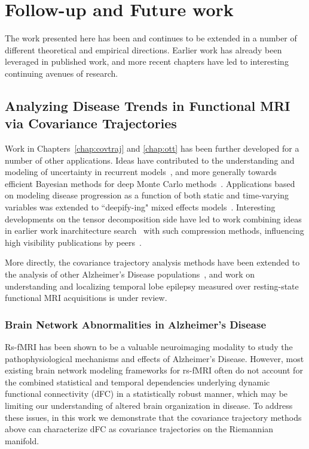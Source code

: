 \chapter{Follow-up and Future work}\label{chap:discuss}

The work presented here has been and continues 
to be extended in a number of different theoretical 
and empirical directions.
Earlier work has already been leveraged in published work,
and more recent chapters
have led to interesting
continuing avenues of research.

\section{Analyzing Disease Trends in Functional MRI via Covariance Trajectories}

Work in Chapters~\ref{chap:covtraj} and \ref{chap:ott} has been further developed for a number of other applications.
Ideas have contributed
to the understanding and modeling of uncertainty
in recurrent models~\citep{spgru},
and more generally towards efficient
Bayesian methods for deep Monte Carlo methods~\citep{mcreparam}.
Applications based on modeling disease progression
as a function of both static and time-varying 
variables was extended to ``deepify-ing" mixed effects models~\citep{deepmem}.
Interesting developments on the tensor decomposition side
have led to work combining ideas
in earlier work inarchitecture search~\citep{submodarch}
with such compression methods,
influencing high visibility publications by peers~\citep{xiong2021mobiledets}.

More directly, the covariance trajectory analysis
methods have been extended 
to the analysis of other Alzheimer's Disease populations~\citep{isbi},
and work on understanding and localizing temporal lobe epilepsy
measured over resting-state functional MRI acquisitions is under review.

\subsection{Brain Network Abnormalities in Alzheimer's Disease}
Rs-fMRI has been shown to be a valuable neuroimaging modality to study the pathophysiological mechanisms and effects of Alzheimer's Disease. 
However, most existing brain network modeling frameworks for rs-fMRI often do not account for the combined statistical and temporal dependencies underlying dynamic functional connectivity (dFC) in a statistically robust manner, 
which may be limiting our understanding of altered brain organization in disease.
To address these issues, in this work we demonstrate that
the covariance trajectory methods above can characterize dFC as covariance trajectories on the Riemannian manifold.

